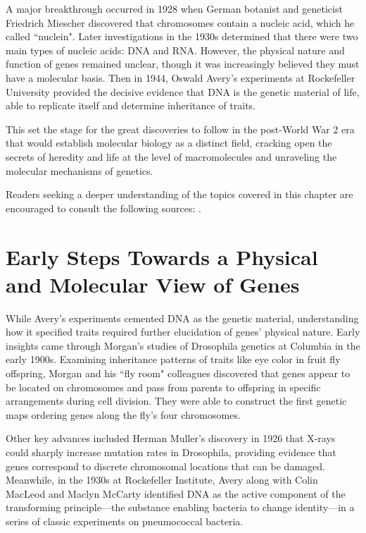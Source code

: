 A major breakthrough occurred in 1928 when German botanist and geneticist Friedrich Miescher discovered that chromosomes contain a nucleic acid, which he called ``nuclein". Later investigations in the 1930s determined that there were two main types of nucleic acids: DNA and RNA. However, the physical nature and function of genes remained unclear, though it was increasingly believed they must have a molecular basis. Then in 1944, Oswald Avery's experiments at Rockefeller University provided the decisive evidence that DNA is the genetic material of life, able to replicate itself and determine inheritance of traits.

This set the stage for the great discoveries to follow in the post-World War 2 era that would establish molecular biology as a distinct field, cracking open the secrets of heredity and life at the level of macromolecules and unraveling the molecular mechanisms of genetics.

Readers seeking a deeper understanding of the topics covered in this chapter are encouraged to consult the following sources: \citep{Watson1968, Stent1968, Perutz1987, Weiner1999, Burian1999, Moore2015}.

\section{Early Steps Towards a Physical and Molecular View of Genes}

While Avery's experiments cemented DNA as the genetic material, understanding how it specified traits required further elucidation of genes' physical nature. Early insights came through Morgan's studies of Drosophila genetics at Columbia in the early 1900s. Examining inheritance patterns of traits like eye color in fruit fly offspring, Morgan and his ``fly room" colleagues discovered that genes appear to be located on chromosomes and pass from parents to offspring in specific arrangements during cell division. They were able to construct the first genetic maps ordering genes along the fly's four chromosomes.

Other key advances included Herman Muller's discovery in 1926 that X-rays could sharply increase mutation rates in Drosophila, providing evidence that genes correspond to discrete chromosomal locations that can be damaged. Meanwhile, in the 1930s at Rockefeller Institute, Avery along with Colin MacLeod and Maclyn McCarty identified DNA as the active component of the transforming principle---the substance enabling bacteria to change identity---in a series of classic experiments on pneumococcal bacteria.

